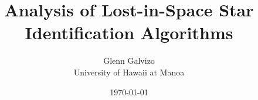 \documentclass[conference]{IEEEtran}
\title{Analysis of Lost-in-Space Star Identification Algorithms}
\author{Glenn Galvizo \\ University of Hawaii at Manoa} \date{\today}
\begin{document}
    \maketitle

    
    
    
    
    
    
    

    \nocite{*}
    
    
\end{document}
